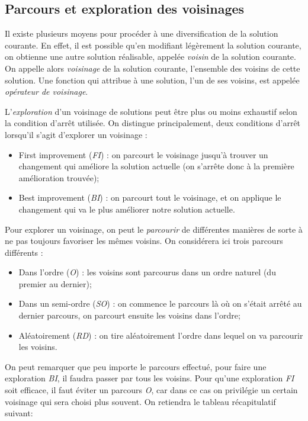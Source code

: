 \documentclass[a4paper,11pt]{article}%
\begin{document}
\subsection{Parcours et exploration des voisinages}
\label{voisinage}

Il existe plusieurs moyens pour procéder à une diversification de la solution courante.
En effet, il est possible qu'en modifiant légèrement la solution courante, on obtienne une autre solution réalisable, appelée \emph{voisin} de la solution courante.
On appelle alors \emph{voisinage} de la solution courante, l'ensemble des voisins de cette solution.
Une fonction qui attribue à une solution, l'un de ses voisins, est appelée \emph{opérateur de voisinage}.

L'\emph{exploration} d'un voisinage de solutions peut être plus ou moins exhaustif selon la condition d'arrêt utilisée.
On distingue principalement, deux conditions d'arrêt lorsqu'il s'agit d'explorer un voisinage :

\begin{itemize}
\item First improvement (\emph{FI}) : on parcourt le voisinage jusqu'à trouver un changement qui améliore la solution actuelle (on s'arrête donc à la première amélioration trouvée);
\item Best improvement (\emph{BI}) : on parcourt tout le voisinage, et on applique le changement qui va le plus améliorer notre solution actuelle. 
\end{itemize}

Pour explorer un voisinage, on peut le \emph{parcourir} de différentes manières de sorte à ne pas toujours favoriser les mêmes voisins. On considérera ici trois parcours différents : 

\begin{itemize}
\item Dans l'ordre (\emph{O}) : les voisins sont parcourus dans un ordre naturel (du premier au dernier);
\item Dans un semi-ordre (\emph{SO}) : on commence le parcours là où on s'était arrêté au dernier parcours, on parcourt ensuite les voisins dans l'ordre;
\item Aléatoirement (\emph{RD}) : on tire aléatoirement l'ordre dans lequel on va parcourir les voisins. 
\end{itemize}

On peut remarquer que peu importe le parcours effectué, pour faire une exploration \emph{BI}, il faudra passer par tous les voisins. Pour qu'une exploration \emph{FI} soit efficace, il faut éviter un parcours \emph{O}, car dans ce cas on privilégie un certain voisinage qui sera choisi plus souvent. On retiendra le tableau récapitulatif suivant:
\end{document}
